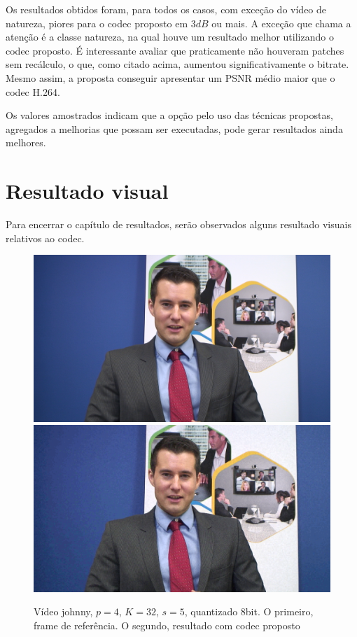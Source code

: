 \documentclass[cic,tc]{iiufrgs}
\begin{document}
Os resultados obtidos foram, para todos os casos, com exceção do vídeo de natureza, piores 
para o codec proposto em $3dB$ ou mais.
A exceção que chama a atenção é a classe natureza, na qual houve um resultado 
melhor utilizando o codec proposto.
É interessante avaliar que praticamente não houveram patches sem recálculo, o que, como citado 
acima, aumentou significativamente o bitrate.
Mesmo assim, a proposta conseguir apresentar um PSNR médio maior que o codec H.264.

Os valores amostrados indicam que a opção pelo uso das técnicas propostas,
agregados a melhorias que possam ser executadas, pode gerar resultados ainda melhores.

\section{Resultado visual}
\label{sec:resultadovisual}
Para encerrar o capítulo de resultados, serão observados alguns resultado visuais relativos 
ao codec.

\begin{figure}[H]
    \caption{Vídeo johnny, $p=4$, $K=32$, $s=5$, quantizado 8bit. O primeiro, frame de referência. 
    O segundo, resultado com codec proposto}
    \begin{center}
        \includegraphics[width=\textwidth]{img/johnnyref.png}
        \includegraphics[width=\textwidth]{img/johnnyres.png}
    \end{center}
    \label{fig:johnnyres}
\end{figure}
\end{document}
